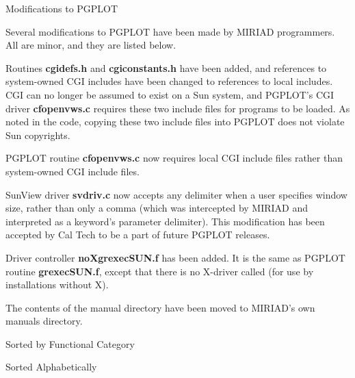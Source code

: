 \beginsection Modifications to PGPLOT

Several modifications to PGPLOT have been made by MIRIAD
programmers.  All are minor, and they are listed below.
\vskip 0.25in

Routines {\bf cgidefs.h} and {\bf cgiconstants.h} have been added, and
references to system-owned CGI includes have been changed to references
to local includes.  CGI can no longer be assumed to exist on a Sun system,
and PGPLOT's CGI driver {\bf cfopenvws.c} requires these two include files
for programs to be loaded.  As noted in the code, copying these two include
files into PGPLOT does not violate Sun copyrights.
\vskip 0.25in

PGPLOT routine {\bf cfopenvws.c} now requires local CGI include files rather
than system-owned CGI include files.
\vskip 0.25in

SunView driver {\bf svdriv.c} now accepts any delimiter when a user
specifies window size, rather than only a comma (which was intercepted by
MIRIAD and interpreted as a keyword's parameter delimiter).  This
modification has been accepted by Cal Tech to be a part of future PGPLOT
releases.
\vskip 0.25in

Driver controller {\bf noXgrexecSUN.f} has been added.  It is the same as
PGPLOT routine {\bf grexecSUN.f}, except that there is no X-driver called
(for use by installations without X).
\vskip 0.25in

The contents of the manual directory have been moved to MIRIAD's own
manuals directory.
\vskip 0.25in

\beginsection Sorted by Functional Category
\par

\beginsection Sorted Alphabetically
\par

\par\endchapter

\par

\par\endchapter

